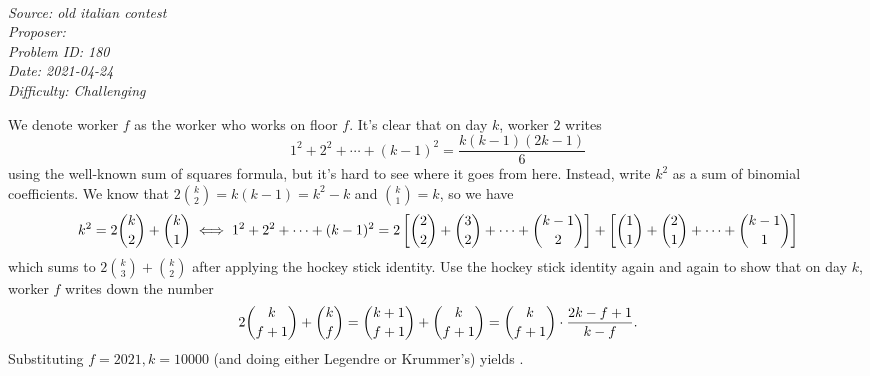 \SSbreak\\
\emph{Source: old italian contest}\\
\emph{Proposer: \Pmatt}\\ %
\emph{Problem ID: 180}\\
\emph{Date: 2021-04-24}\\
\emph{Difficulty: Challenging}\\
\SSbreak
 
\bigskip

\begin{solution}\hfil\medskip
	
    We denote worker $f$ as the worker who works on floor $f$. It's clear that on day $k$, worker $2$ writes $$1^2 + 2^2 + \cdots + (k - 1)^2 = \dfrac{k(k - 1)(2k - 1)}{6}$$
    using the well-known sum of squares formula, but it's hard to see where it goes from here. Instead, write $k^2$ as a sum of binomial coefficients. We know that $2\binom{k}{2} = k(k - 1) = k^2 - k$
    and $\binom{k}{1} = k$, so we have $$k^2 = 2\dbinom{k}{2} + \dbinom{k}{1} \iff 1^2 + 2^2 + \cdots + (k - 1)^2 = 2\left[\dbinom{2}{2} + \dbinom{3}{2} + \cdots + \dbinom{k - 1}{2}\right] + \left[\dbinom{1}{1} + \dbinom{2}{1} + \cdots + \dbinom{k - 1}{1}\right]$$
    which sums to $2\binom{k}{3} + \binom{k}{2}$ after applying the hockey stick identity. Use the hockey stick identity again and again to show that on day $k$, 
    worker $f$ writes down the number $$2\dbinom{k}{f + 1} + \dbinom{k}{f} = \dbinom{k + 1}{f + 1} + \dbinom{k}{f + 1} = \dbinom{k}{f + 1} \cdot \dfrac{2k - f + 1}{k - f}.$$ Substituting $f = 2021, k = 10000$ (and doing either Legendre or Krummer's) yields .
\end{solution}\bigskip
